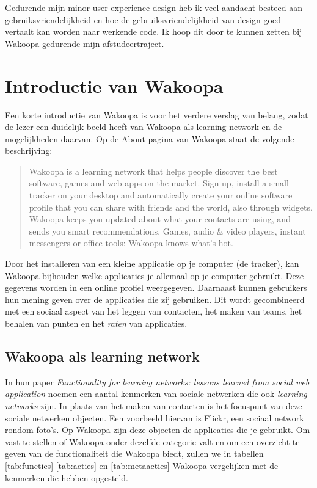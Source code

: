 \documentclass[a4paper, 10pt, pdftex]{report}
\begin{document}
    Gedurende mijn minor user experience design heb ik veel aandacht besteed aan gebruiksvriendelijkheid en hoe de gebruiksvriendelijkheid van design goed vertaalt kan worden naar werkende code. Ik hoop dit door te kunnen zetten bij Wakoopa gedurende mijn afstudeertraject.




    \section{Introductie van Wakoopa}
      Een korte introductie van Wakoopa is voor het verdere verslag van belang, zodat de lezer een duidelijk beeld heeft van Wakoopa als learning network en de mogelijkheden daarvan. Op de About pagina van Wakoopa \citep{Gaal2007} staat de volgende beschrijving:
        \begin{quote} Wakoopa is a learning network that helps people discover the best software, games and web apps on the market. Sign-up, install a small tracker on your desktop and automatically create your online software profile that you can share with friends and the world, also through widgets. Wakoopa keeps you updated about what your contacts are using, and sends you smart recommendations. Games, audio \& video players, instant messengers or office tools: Wakoopa knows what's hot.
        \end{quote}
      Door het installeren van een kleine applicatie op je computer (de tracker), kan Wakoopa bijhouden welke applicaties je allemaal op je computer gebruikt. Deze gegevens worden in een online profiel weergegeven. Daarnaast kunnen gebruikers hun mening geven over de applicaties die zij gebruiken. Dit wordt gecombineerd met een sociaal aspect van het leggen van contacten, het maken van teams, het behalen van punten en het \emph{raten} van applicaties.

        \subsection{Wakoopa als learning network}
        In hun paper \emph{Functionality for learning networks: lessons learned from social web application} noemen \citeauthor{Berlanga2007} een aantal kenmerken van sociale netwerken die ook \emph{learning networks} zijn. In plaats van het maken van contacten is het focuspunt van deze sociale netwerken objecten. Een voorbeeld hiervan is Flickr, een sociaal network rondom foto's. Op Wakoopa zijn deze objecten de applicaties die je gebruikt. Om vast te stellen of Wakoopa onder dezelfde categorie valt en om een overzicht te geven van de functionaliteit die Wakoopa biedt, zullen we in tabellen \ref{tab:functies} \ref{tab:acties} en \ref{tab:metaacties} \label{learningnetwork} Wakoopa vergelijken met de kenmerken die \citeauthor{Berlanga2007} hebben opgesteld.
\end{document}
